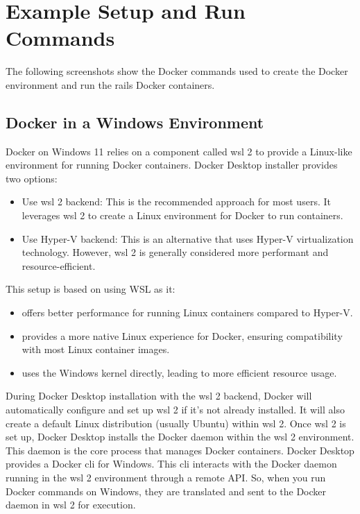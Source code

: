 \chapter{Example Setup and Run Commands}
\label{app:examplecommands}
The following screenshots show the Docker commands used to create the Docker environment and run the \gls{rails} Docker containers.
\section{Docker in a Windows Environment}
\label{sec:win-cmds}
Docker on Windows 11 relies on a component called \gls{wsl 2} to provide a Linux-like environment for running Docker containers. Docker Desktop installer provides two options:
\begin{itemize}
    \item Use \gls{wsl 2} backend: This is the recommended approach for most users. It leverages \gls{wsl 2} to create a Linux environment for Docker to run containers.
    \item Use Hyper-V backend: This is an alternative that uses Hyper-V virtualization technology. However, \gls{wsl 2} is generally considered more performant and resource-efficient.   
\end{itemize}
This setup is based on using WSL as it:
\begin{itemize}
    \item offers better performance for running Linux containers compared to Hyper-V.
    \item provides a more native Linux experience for Docker, ensuring compatibility with most Linux container images.
    \item uses the Windows kernel directly, leading to more efficient resource usage.
\end{itemize}
During Docker Desktop installation with the \gls{wsl 2} backend, Docker will automatically configure and set up \gls{wsl 2} if it's not already installed. It will also create a default Linux distribution (usually Ubuntu) within \gls{wsl 2}. Once \gls{wsl 2} is set up, Docker Desktop installs the Docker daemon within the \gls{wsl 2} environment. This daemon is the core process that manages Docker containers.
Docker Desktop provides a Docker \gls{cli} for Windows. This \gls{cli} interacts with the Docker daemon running in the \gls{wsl 2} environment through a remote API. So, when you run Docker commands on Windows, they are translated and sent to the Docker daemon in \gls{wsl 2} for execution.\vspace{5mm} \\
